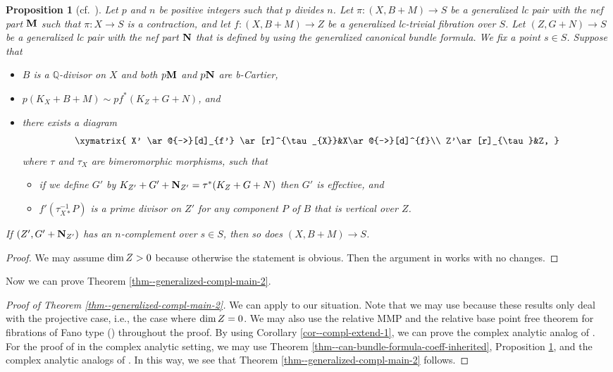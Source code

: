 \documentclass[12pt]{amsart}
\newtheorem{prop}[thm]{Proposition}
\theoremstyle{definition}
\begin{document}
\begin{prop}[cf.~{\cite[Proposition 3.7]{chhx-compl}}]\label{prop--compl-extend-fib}
Let $p$ and $n$ be positive integers such that $p$ divides $n$. 
Let $\pi \colon (X,B+M) \to S$ be a generalized lc pair with the nef part $\boldsymbol{\rm M}$ such that $\pi \colon X \to S$ is a contraction, and let $f\colon (X,B+M) \to Z$ be a generalized lc-trivial fibration over $S$. 
Let $(Z, G +N) \to S$ be a generalized lc pair with the nef part $\boldsymbol{\rm N}$ that is defined by using the generalized canonical bundle formula. 
We fix a point $s \in S$. 
Suppose that 
\begin{itemize}
\item
$B$ is a $\mathbb{Q}$-divisor on $X$ and both $p\boldsymbol{\rm M}$ and $p\boldsymbol{\rm N}$ are b-Cartier, 
\item
$p(K_{X}+B+M) \sim pf^{*}(K_{Z}+G+N)$, and 
\item
there exists a diagram 
$$
\xymatrix{
X' \ar@{->}[d]_{f'} \ar[r]^{\tau_{X}}&X\ar@{->}[d]^{f}\\
Z'\ar[r]_{\tau}&Z,
}
$$
where $\tau$ and $\tau_{X}$ are bimeromorphic morphisms, such that 
\begin{itemize}
\item
if we define $G'$ by $K_{Z'}+G'+\boldsymbol{\rm N}_{Z'}=\tau^{*}(K_{Z}+G+N)$ then $G'$ is effective, and  
\item
$f'(\tau^{-1}_{X*}P)$ is a prime divisor on $Z'$ for any component $P$ of $B$ that is vertical over $Z$. 
\end{itemize}
\end{itemize}
If $(Z',G'+\boldsymbol{\rm N}_{Z'})$ has an $n$-complement over $s \in S$, then so does $(X,B+M) \to S$. 
\end{prop}

\begin{proof}
We may assume ${\rm dim}\,Z>0$ because otherwise the statement is obvious. 
Then the argument in \cite[Proof of Proposition 3.7]{chhx-compl} works with no changes. 
\end{proof}

Now we can prove Theorem \ref{thm--generalized-compl-main-2}. 

\begin{proof}[Proof of Theorem \ref{thm--generalized-compl-main-2}]
We can apply \cite[Proof of Theorem 8.1]{chhx-compl} to our situation. 
Note that we may use \cite[Theorem 5.1, Theorem 6.1, Proposition 6.6]{chhx-compl} because these results only deal with the projective case, i.e., the case where ${\rm dim}\,Z=0$. 
We may also use the relative MMP and the relative base point free theorem for fibrations of Fano type (\cite{fujino-analytic-bchm}) throughout the proof. 
By using Corollary \ref{cor--compl-extend-1}, we can prove the complex analytic analog of \cite[Theorem 7.1]{chhx-compl}. 
For the proof of \cite[Theorem 8.1]{chhx-compl} in the complex analytic setting, we may use Theorem \ref{thm--can-bundle-formula-coeff-inherited}, Proposition \ref{prop--compl-extend-fib}, and the complex analytic analogs of \cite[Lemma 2.16, Lemma 2.18, Lemma 3.3]{chhx-compl}. 
In this way, we see that Theorem \ref{thm--generalized-compl-main-2} follows. 
\end{proof}
\end{document}
